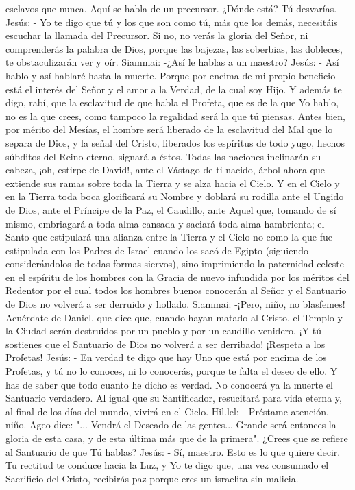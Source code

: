 \documentclass[12pt]{book} %
\begin{document}
esclavos que nunca. Aquí se habla de un precursor. ¿Dónde está? Tú desvarías. 
Jesús: - Yo te digo que tú y los que son como tú, más que los demás, necesitáis escuchar la llamada del Precursor. Si no, 
no verás la gloria del Señor, ni comprenderás la palabra de Dios, porque las bajezas, las soberbias, las dobleces, te obstaculizarán ver y oír. 
Siammai: -¿Así le hablas a un maestro?          
Jesús: - Así hablo y así hablaré hasta la muerte. Porque por encima de mi propio beneficio está el interés del Señor y el 
amor a la Verdad, de la cual soy Hijo. Y además te digo, rabí, que la esclavitud de que habla el Profeta, que es de la que Yo hablo, no es la que crees, como tampoco la regalidad será la que tú piensas. Antes bien, por mérito del Mesías, el hombre será liberado de la esclavitud del Mal que lo separa de Dios, y la señal del Cristo, liberados los espíritus de todo yugo, hechos súbditos del Reino eterno, signará a éstos. Todas las naciones inclinarán su cabeza, ¡oh, estirpe de David!, ante el Vástago de ti nacido, árbol ahora que extiende sus ramas sobre toda la Tierra y se alza hacia el Cielo. Y en el Cielo y en la Tierra toda boca glorificará su Nombre y doblará su rodilla ante el Ungido de Dios, ante el Príncipe de la Paz, el Caudillo, ante Aquel que, tomando de sí mismo, embriagará a toda alma cansada y saciará toda alma hambrienta; el Santo que estipulará una alianza entre la Tierra y el Cielo no como la que fue estipulada con los Padres de Israel cuando los sacó de Egipto (siguiendo considerándolos de todas formas siervos), sino imprimiendo la paternidad celeste en el espíritu de los hombres con la Gracia de nuevo infundida por los méritos del Redentor por el cual todos los hombres buenos conocerán al Señor y el Santuario de Dios no volverá a ser derruido y hollado. 
Siammai: -¡Pero, niño, no blasfemes! Acuérdate de Daniel, que dice que, cuando hayan matado al Cristo, el Templo y la Ciudad serán destruidos por un pueblo y por un caudillo venidero. ¡Y tú sostienes que el Santuario de Dios no volverá a ser derribado! ¡Respeta a los Profetas! 
Jesús: - En verdad te digo que hay Uno que está por encima de los Profetas, y tú no lo conoces, ni lo conocerás, porque 
te falta el deseo de ello. Y has de saber que todo cuanto he dicho es verdad. No conocerá ya la muerte el Santuario verdadero. 
Al igual que su Santificador, resucitará para vida eterna y, al final de los días del mundo, vivirá en el Cielo. 
Hil.lel: - Préstame atención, niño. Ageo dice: "... Vendrá el Deseado de las gentes... Grande será entonces la gloria de 
esta casa, y de esta última más que de la primera". ¿Crees que se refiere al Santuario de que Tú hablas? 
Jesús: - Sí, maestro. Esto es lo que quiere decir. Tu rectitud te conduce hacia la Luz, y Yo te digo que, una vez 
consumado el Sacrificio del Cristo, recibirás paz porque eres un israelita sin malicia. 
 
\end{document}
